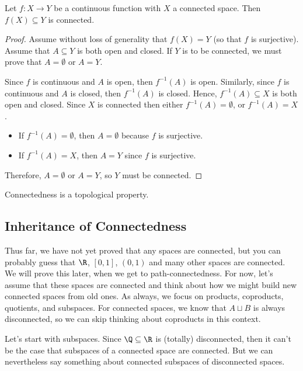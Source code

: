 \documentclass[noname]{notes}
\begin{document}
\begin{proposition}
\label{continuous image of compact is compact}
	Let $f \colon X \to Y$ be a continuous function with $X$ a connected space. Then $f(X) \subseteq Y$ is connected. 
\end{proposition}

\begin{proof}
	Assume without loss of generality that $f(X) = Y$ (so that $f$ is surjective). Assume that $A \subseteq Y$ is both open and closed. If $Y$ is to be connected, we must prove that $A = \emptyset$ or $A = Y$. 
	
	Since $f$ is continuous and $A$ is open, then $f^{-1}(A)$ is open. Similarly, since $f$ is continuous and $A$ is closed, then $f^{-1}(A)$ is closed. Hence, $f^{-1}(A) \subseteq X$ is both open and closed. Since $X$ is connected then either $f^{-1}(A) = \emptyset$, or $f^{-1}(A) = X$. 
	\begin{itemize}
		\item If $f^{-1}(A) = \emptyset$, then $A = \emptyset$ because $f$ is surjective. 
		\item If $f^{-1}(A) = X$, then $A = Y$ since $f$ is surjective. 
	\end{itemize}
	Therefore, $A = \emptyset$ or $A = Y$, so $Y$ must be connected. 
\end{proof}	

\begin{corollary}
	Connectedness is a topological property. 
\end{corollary}

\subsection{Inheritance of Connectedness} 

Thus far, we have not yet proved that any spaces are connected, but you can probably guess that $\R$, $[0,1]$, $(0,1)$ and many other spaces are connected. We will prove this later, when we get to path-connectedness. For now, let's assume that these spaces are connected and think about how we might build new connected spaces from old ones. As always, we focus on products, coproducts, quotients, and subspaces. For connected spaces, we know that $A \sqcup B$ is always disconnected, so we can skip thinking about coproducts in this context. 

Let's start with subspaces. Since $\Q \subseteq \R$ is (totally) disconnected, then it can't be the case that subspaces of a connected space are connected. But we can nevertheless say something about connected subspaces of disconnected spaces. 
\end{document}

